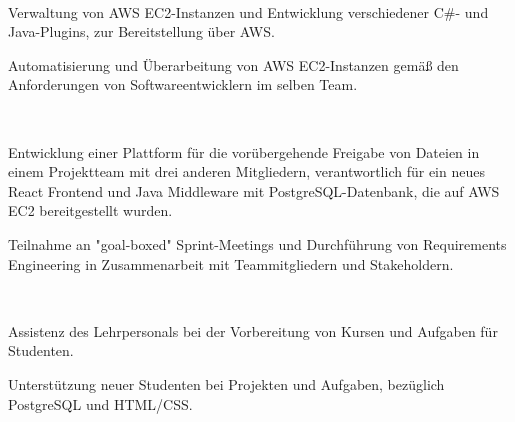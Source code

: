 \documentclass[]{deedy-resume-openfont}
\begin{document}
\sectionsep

\\ 
\begin{tightemize}
	\item Verwaltung von AWS EC2-Instanzen und Entwicklung verschiedener C\#- und Java-Plugins, zur Bereitstellung über AWS.
	\item Automatisierung und Überarbeitung von AWS EC2-Instanzen gemäß den Anforderungen von Softwareentwicklern im selben Team.
\end{tightemize}

\sectionsep

\\ 
\begin{tightemize}
	\item Entwicklung einer Plattform für die vorübergehende Freigabe von Dateien in einem Projektteam mit drei anderen Mitgliedern, verantwortlich für ein neues React Frontend und Java Middleware mit PostgreSQL-Datenbank, die auf AWS EC2 bereitgestellt wurden.
	\item Teilnahme an "goal-boxed" Sprint-Meetings und Durchführung von Requirements Engineering in Zusammenarbeit mit Teammitgliedern und Stakeholdern.
\end{tightemize}

\sectionsep

\\ 
\begin{tightemize}
	\item Assistenz des Lehrpersonals bei der Vorbereitung von Kursen und Aufgaben für Studenten.
	\item Unterstützung neuer Studenten bei Projekten und Aufgaben, bezüglich PostgreSQL und HTML/CSS.
\end{tightemize}

\sectionsep



%
%
\end{document}
